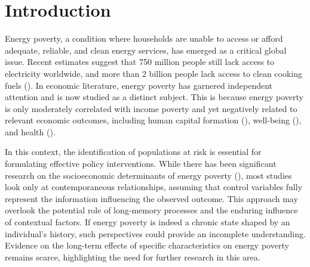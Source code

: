 \documentclass[preprint,authoryear,12pt]{elsarticle}
\newcommand{\citeTwo}[1]{(\cite{#1})}
\begin{document}
\begin{frontmatter}

\end{frontmatter}

\linenumbers


\section{Introduction}	\label{Introduction}	

Energy poverty, a condition where households are unable to access or afford adequate, reliable, and clean energy services, has emerged as a critical global issue. Recent estimates suggest that 750 million people still lack access to electricity worldwide, and more than 2 billion people lack access to clean cooking fuels \citeTwo{IEA24}. In economic literature, energy poverty has garnered independent attention and is now studied as a distinct subject. This is because energy poverty is only moderately correlated with income poverty and yet negatively related to relevant economic outcomes, including human capital formation \citeTwo{PK19}, well-being \citeTwo{NHL24}, and health \citeTwo{PEND24}.

In this context, the identification of populations at risk is essential for formulating effective policy interventions. While there has been significant research on the socioeconomic determinants of energy poverty \citeTwo{FFT22,ABR22,KA22}, most studies look only at contemporaneous relationships, assuming that control variables fully represent the information influencing the observed outcome. This approach may overlook the potential role of long-memory processes and the enduring influence of contextual factors. If energy poverty is indeed a chronic state shaped by an individual's history, such perspectives could provide an incomplete understanding. Evidence on the long-term effects of specific characteristics on energy poverty remains scarce, highlighting the need for further research in this area.
\end{document}

